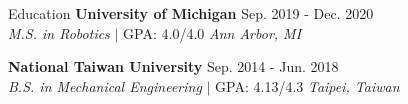 \documentclass{resume} %
\begin{document}
\begin{rSection}{Education}
    \textbf{University of Michigan} \hfill Sep. 2019 - Dec. 2020$\ $\\
    \textit{M.S. in Robotics} $|$ GPA: 4.0/4.0 \hfill \textit{Ann Arbor, MI}

    \textbf{National Taiwan University} \hfill Sep. 2014 - Jun. 2018$\ $\\
    \textit{B.S. in Mechanical Engineering} $|$ GPA: 4.13/4.3 \hfill \textit{Taipei, Taiwan}


\end{rSection}



\end{document}
